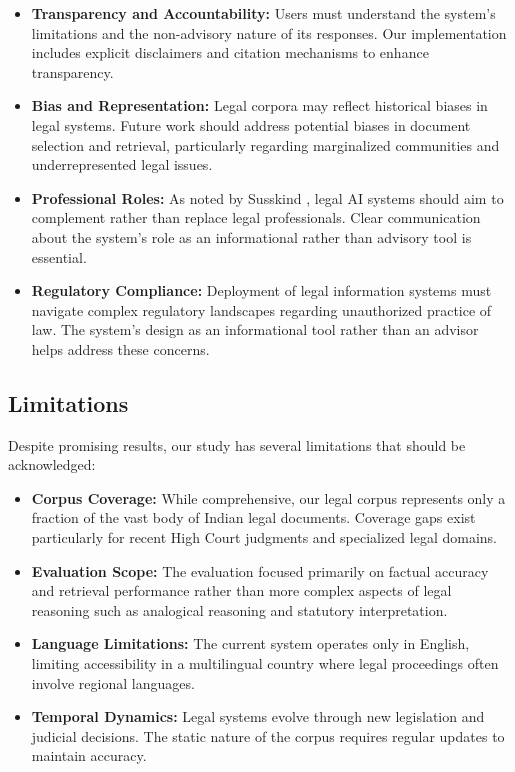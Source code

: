 \documentclass[conference]{IEEEtran}
\begin{document}
\begin{itemize}
    \item \textbf{Transparency and Accountability:} Users must understand the system's limitations and the non-advisory nature of its responses. Our implementation includes explicit disclaimers and citation mechanisms to enhance transparency.
    
    \item \textbf{Bias and Representation:} Legal corpora may reflect historical biases in legal systems. Future work should address potential biases in document selection and retrieval, particularly regarding marginalized communities and underrepresented legal issues.
    
    \item \textbf{Professional Roles:} As noted by Susskind \cite{susskind2019}, legal AI systems should aim to complement rather than replace legal professionals. Clear communication about the system's role as an informational rather than advisory tool is essential.
    
    \item \textbf{Regulatory Compliance:} Deployment of legal information systems must navigate complex regulatory landscapes regarding unauthorized practice of law. The system's design as an informational tool rather than an advisor helps address these concerns.
\end{itemize}

\subsection{Limitations}

Despite promising results, our study has several limitations that should be acknowledged:

\begin{itemize}
    \item \textbf{Corpus Coverage:} While comprehensive, our legal corpus represents only a fraction of the vast body of Indian legal documents. Coverage gaps exist particularly for recent High Court judgments and specialized legal domains.
    
    \item \textbf{Evaluation Scope:} The evaluation focused primarily on factual accuracy and retrieval performance rather than more complex aspects of legal reasoning such as analogical reasoning and statutory interpretation.
    
    \item \textbf{Language Limitations:} The current system operates only in English, limiting accessibility in a multilingual country where legal proceedings often involve regional languages.
    
    \item \textbf{Temporal Dynamics:} Legal systems evolve through new legislation and judicial decisions. The static nature of the corpus requires regular updates to maintain accuracy.
\end{itemize}
\end{document}
